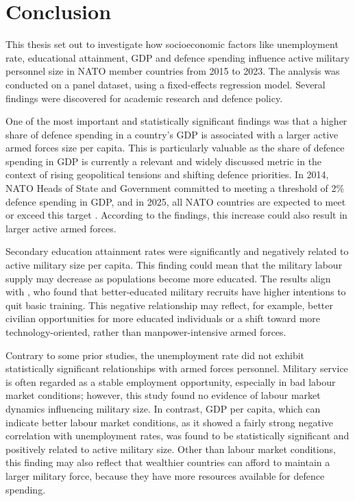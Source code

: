 \chapter{Conclusion}

This thesis set out to investigate how socioeconomic factors like unemployment rate, educational attainment, GDP and defence spending influence active military personnel size in NATO member countries from 2015 to 2023. 
The analysis was conducted on a panel dataset, using a fixed-effects regression model.
Several findings were discovered for academic research and defence policy.

One of the most important and statistically significant findings was that a higher share of defence spending in a country's GDP is associated with a larger active armed forces size per capita.
This is particularly valuable as the share of defence spending in GDP is currently a relevant and widely discussed metric in the context of rising geopolitical tensions and shifting defence priorities.
In 2014, NATO Heads of State and Government committed to meeting a threshold of 2\% defence spending in GDP, and in 2025, all NATO countries are expected to meet or exceed this target \parencite{nato_defence_2025}. 
According to the findings, this increase could also result in larger active armed forces.

Secondary education attainment rates were significantly and negatively related to active military size per capita. 
This finding could mean that the military labour supply may decrease as populations become more educated. 
The results align with \textcite{hof_quality_2023}, who found that better-educated military recruits have higher intentions to quit basic training.
This negative relationship may reflect, for example, better civilian opportunities for more educated individuals or a shift toward more technology-oriented, rather than manpower-intensive armed forces.

Contrary to some prior studies, the unemployment rate did not exhibit statistically significant relationships with armed forces personnel. 
Military service is often regarded as a stable employment opportunity, especially in bad labour market conditions; however, this study found no evidence of labour market dynamics influencing military size. 
In contrast, GDP per capita, which can indicate better labour market conditions, as it showed a fairly strong negative correlation with unemployment rates, was found to be statistically significant and positively related to active military size. 
Other than labour market conditions, this finding may also reflect that wealthier countries can afford to maintain a larger military force, because they have more resources available for defence spending. 

